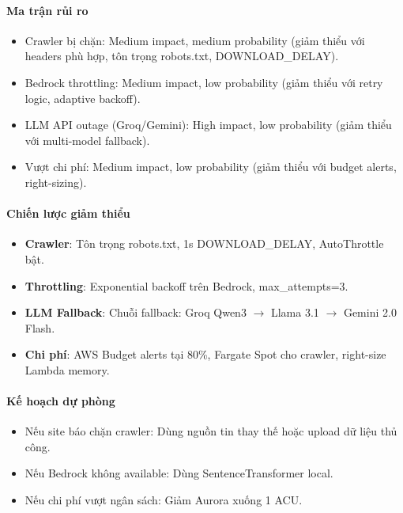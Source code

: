 \hypertarget{ma-trux1eadn-rux1ee7i-ro}{%
\paragraph{Ma trận rủi ro}}

\begin{itemize}
\tightlist
\item
  Crawler bị chặn: Medium impact, medium probability (giảm thiểu với
  headers phù hợp, tôn trọng robots.txt, DOWNLOAD\_DELAY).
\item
  Bedrock throttling: Medium impact, low probability (giảm thiểu với
  retry logic, adaptive backoff).
\item
  LLM API outage (Groq/Gemini): High impact, low probability (giảm thiểu
  với multi-model fallback).
\item
  Vượt chi phí: Medium impact, low probability (giảm thiểu với budget
  alerts, right-sizing).
\end{itemize}

\hypertarget{chiux1ebfn-lux1b0ux1ee3c-giux1ea3m-thiux1ec3u}{%
\paragraph{Chiến lược giảm
thiểu}}

\begin{itemize}
\tightlist
\item
  \textbf{Crawler}: Tôn trọng robots.txt, 1s DOWNLOAD\_DELAY,
  AutoThrottle bật.
\item
  \textbf{Throttling}: Exponential backoff trên Bedrock,
  max\_attempts=3.
\item
  \textbf{LLM Fallback}: Chuỗi fallback: Groq Qwen3 \(\rightarrow\)
  Llama 3.1 \(\rightarrow\) Gemini 2.0 Flash.
\item
  \textbf{Chi phí}: AWS Budget alerts tại 80\%, Fargate Spot cho
  crawler, right-size Lambda memory.
\end{itemize}

\hypertarget{kux1ebf-houx1ea1ch-dux1ef1-phuxf2ng}{%
\paragraph{Kế hoạch dự
phòng}}

\begin{itemize}
\tightlist
\item
  Nếu site báo chặn crawler: Dùng nguồn tin thay thế hoặc upload dữ liệu
  thủ công.
\item
  Nếu Bedrock không available: Dùng SentenceTransformer local.
\item
  Nếu chi phí vượt ngân sách: Giảm Aurora xuống 1 ACU.
\end{itemize}

